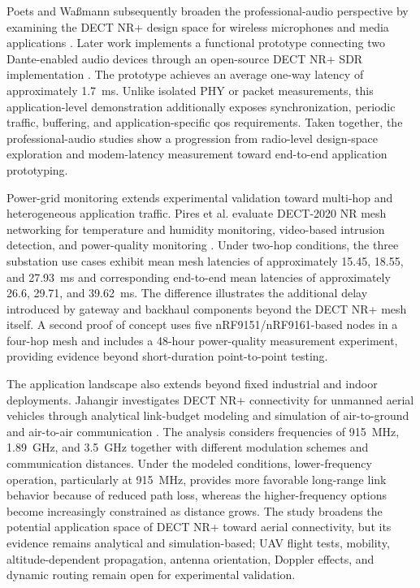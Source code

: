 Poets and Wa{\ss}mann subsequently broaden the professional-audio perspective
by examining the DECT NR+ design space for wireless microphones and media
applications
\cite{poetsDECTNRNew2024}. Later work implements a functional prototype
connecting two Dante-enabled audio devices through an open-source DECT NR+ SDR
implementation
\cite{poetsProfessionalNetworkedAudio2025}. The prototype achieves an average
one-way latency of approximately 1.7~ms. Unlike isolated PHY or packet
measurements, this application-level demonstration additionally exposes
synchronization, periodic traffic, buffering, and application-specific
\gls{qos} requirements. Taken together, the professional-audio studies show a
progression from radio-level design-space exploration and modem-latency
measurement toward end-to-end application prototyping.

Power-grid monitoring extends experimental validation toward multi-hop and
heterogeneous application traffic. Pires et al. evaluate DECT-2020 NR mesh
networking for temperature and humidity monitoring, video-based intrusion
detection, and power-quality monitoring
\cite{piresDECT2020NREnergy2026b}. Under two-hop conditions, the three
substation use cases exhibit mean mesh latencies of approximately 15.45,
18.55, and 27.93~ms and corresponding end-to-end mean latencies of
approximately 26.6, 29.71, and 39.62~ms. The difference illustrates the
additional delay introduced by gateway and backhaul components beyond the
DECT NR+ mesh itself. A second proof of concept uses five
nRF9151/nRF9161-based nodes in a four-hop mesh and includes a 48-hour
power-quality measurement experiment, providing evidence beyond short-duration
point-to-point testing.

The application landscape also extends beyond fixed industrial and indoor
deployments. Jahangir investigates DECT NR+ connectivity for unmanned aerial
vehicles through analytical link-budget modeling and simulation of
air-to-ground and air-to-air communication
\cite{jahangirAnalysisPerformanceDECT2024}. The analysis considers frequencies
of 915~MHz, 1.89~GHz, and 3.5~GHz together with different modulation schemes
and communication distances. Under the modeled conditions, lower-frequency
operation, particularly at 915~MHz, provides more favorable long-range link
behavior because of reduced path loss, whereas the higher-frequency options
become increasingly constrained as distance grows. The study broadens the
potential application space of DECT NR+ toward aerial connectivity, but its
evidence remains analytical and simulation-based; UAV flight tests, mobility,
altitude-dependent propagation, antenna orientation, Doppler effects, and
dynamic routing remain open for experimental validation.

